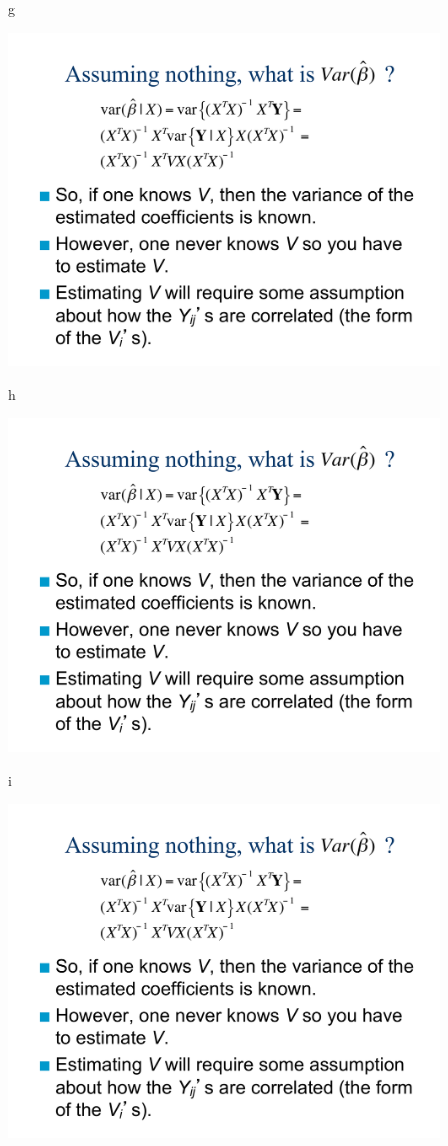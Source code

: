 \documentclass[ignorenonframetext,]{beamer}
\begin{document}
\begin{frame}{g}

\includegraphics[page=8,width=4.5in]{Chapter5AddSlides1.pdf}

\end{frame}

\begin{frame}{h}

\includegraphics[page=9,width=4.5in]{Chapter5AddSlides1.pdf}

\end{frame}

\begin{frame}{i}

\includegraphics[page=10,width=4.5in]{Chapter5AddSlides1.pdf}

\end{frame}
\end{document}
